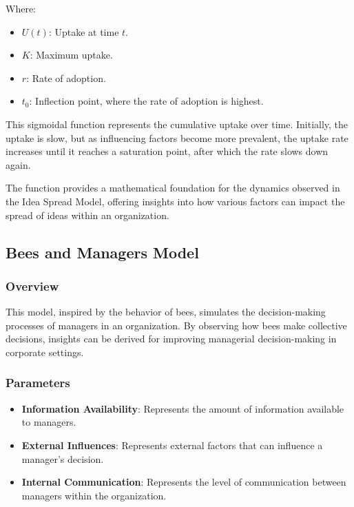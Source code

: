 \documentclass[sn-nature]{sn-jnl}%
\newcommand{\sbt}{\,\begin{picture}(-1,1)(-1,-3)\circle*{3}\end{picture}\ }
\theoremstyle{thmstyleone}%
\theoremstyle{thmstyletwo}%
\theoremstyle{thmstylethree}%
\begin{document}
Where:
\begin{itemize}
    \item[\sbt] \( U(t) \): Uptake at time \( t \).
    \item[\sbt] \( K \): Maximum uptake.
    \item[\sbt] \( r \): Rate of adoption.
    \item[\sbt] \( t_0 \): Inflection point, where the rate of adoption is highest.
\end{itemize}

This sigmoidal function represents the cumulative uptake over time. Initially, the uptake is slow, but as influencing factors become more prevalent, the uptake rate increases until it reaches a saturation point, after which the rate slows down again. 

The function provides a mathematical foundation for the dynamics observed in the Idea Spread Model, offering insights into how various factors can impact the spread of ideas within an organization.

\subsection{Bees and Managers Model}

\subsubsection{Overview}
This model, inspired by the behavior of bees, simulates the decision-making processes of managers in an organization. By observing how bees make collective decisions, insights can be derived for improving managerial decision-making in corporate settings.

\subsubsection{Parameters}
\begin{itemize}
    \item[\sbt] \textbf{Information Availability}: Represents the amount of information available to managers.
    \item[\sbt] \textbf{External Influences}: Represents external factors that can influence a manager's decision.
    \item[\sbt] \textbf{Internal Communication}: Represents the level of communication between managers within the organization.
\end{itemize}
\end{document}
